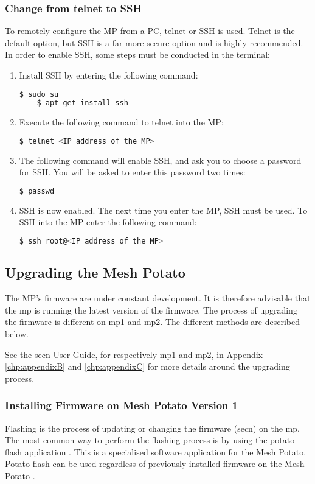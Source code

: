 \subsubsection{Change from telnet to SSH}
\label{subsubsec:ssh}
To remotely configure the MP from a PC, telnet or SSH is used. Telnet is the default option, but SSH is a far more secure option and is highly recommended. In order to enable SSH, some steps must be conducted in the terminal:
\begin{enumerate}
\item Install SSH by entering the following command:
\noindent
\begin{lstlisting}[language=bash]
	$ sudo su
	$ apt-get install ssh
\end{lstlisting}
\item Execute the following command to telnet into the MP:
\noindent
\begin{lstlisting}[language=bash]
	$ telnet <IP address of the MP>
\end{lstlisting}
\item The following command will enable SSH, and ask you to choose a password for SSH. You will be asked to enter this password two times:
\noindent
\begin{lstlisting}[language=bash]
	$ passwd
\end{lstlisting}
\item SSH is now enabled. The next time you enter the MP, SSH must be used. To SSH into the MP enter the following command:
\noindent
\begin{lstlisting}[language=bash]
	$ ssh root@<IP address of the MP>
\end{lstlisting}
\end{enumerate}


\subsection{Upgrading the Mesh Potato}
\label{subsec:upgrading}
The MP's firmware are under constant development. It is therefore advisable that the \gls{mp} is running the latest version of the firmware. The process of upgrading the firmware is different on \gls{mp1} and \gls{mp2}. The different methods are described below. 

See the \gls{secn} User Guide, for respectively \gls{mp1} and \gls{mp2}, in Appendix \ref{chp:appendixB} and \ref{chp:appendixC} for more details around the upgrading process.

\subsubsection{Installing Firmware on Mesh Potato Version 1}
Flashing is the process of updating or changing the firmware (\gls{secn}) on the \gls{mp}. The most common way to perform the flashing process is by using the potato-flash application \cite{flashing}. This is a specialised software application for the Mesh Potato. Potato-flash can be used regardless of previously installed firmware on the Mesh Potato \cite{InstallingSecnFirmware}. 

